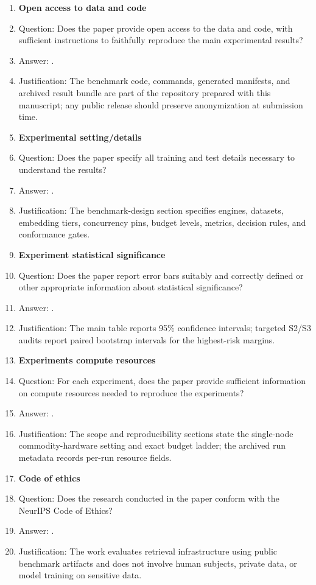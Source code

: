 \begin{enumerate}
\item {\bf Open access to data and code}
    \item[] Question: Does the paper provide open access to the data and code, with sufficient instructions to faithfully reproduce the main experimental results?
    \item[] Answer: \answerYes{}.
    \item[] Justification: The benchmark code, commands, generated manifests, and archived result bundle are part of the repository prepared with this manuscript; any public release should preserve anonymization at submission time.

\item {\bf Experimental setting/details}
    \item[] Question: Does the paper specify all training and test details necessary to understand the results?
    \item[] Answer: \answerYes{}.
    \item[] Justification: The benchmark-design section specifies engines, datasets, embedding tiers, concurrency pins, budget levels, metrics, decision rules, and conformance gates.

\item {\bf Experiment statistical significance}
    \item[] Question: Does the paper report error bars suitably and correctly defined or other appropriate information about statistical significance?
    \item[] Answer: \answerYes{}.
    \item[] Justification: The main table reports 95\% confidence intervals; targeted S2/S3 audits report paired bootstrap intervals for the highest-risk margins.

\item {\bf Experiments compute resources}
    \item[] Question: For each experiment, does the paper provide sufficient information on compute resources needed to reproduce the experiments?
    \item[] Answer: \answerYes{}.
    \item[] Justification: The scope and reproducibility sections state the single-node commodity-hardware setting and exact budget ladder; the archived run metadata records per-run resource fields.

\item {\bf Code of ethics}
    \item[] Question: Does the research conducted in the paper conform with the NeurIPS Code of Ethics?
    \item[] Answer: \answerYes{}.
    \item[] Justification: The work evaluates retrieval infrastructure using public benchmark artifacts and does not involve human subjects, private data, or model training on sensitive data.


\end{enumerate}
